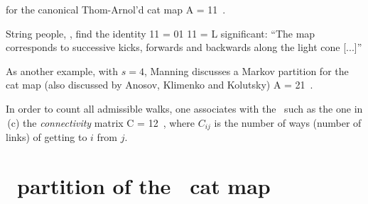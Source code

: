  for the canonical
Thom-Arnol'd cat map
\beq
A =
         {1}{1}
\,.

String people, , find the identity
\beq
{}
         {1}{1}
=
         {0}{1}
         {1}{1}
= L
significant: ``The map corresponds to successive kicks, forwards and
backwards along the light cone [...]''

As another example, with $s=4$,
Manning discusses a Markov partition for the cat map
(also discussed by Anosov, Klimenko and Kolutsky)
\beq
A =
         {2}{1}
\,.

                                        \toCB
In order to count all admissible walks, one associates with the \markGraph\
such as the one in \,(c) the {\em connectivity} matrix
\beq
C =
         {1}{2}
\,,
where $C_{ij}$ is the number of ways (number of links) of getting to $i$ from
$j$.



\section{\AW\ partition of the \PV\ cat map}
\label{sect:AdlWeiPV}


